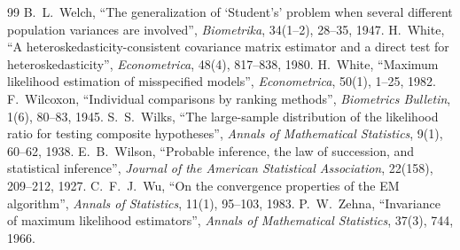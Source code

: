 \documentclass[main.tex]{subfiles}
\begin{document}
\begin{thebibliography}{99}
 B.~L.~Welch, ``The generalization of `Student's' problem when several different population variances are involved'', \emph{Biometrika}, 34(1--2), 28--35, 1947.
 H.~White, ``A heteroskedasticity-consistent covariance matrix estimator and a direct test for heteroskedasticity'', \emph{Econometrica}, 48(4), 817--838, 1980.
 H.~White, ``Maximum likelihood estimation of misspecified models'', \emph{Econometrica}, 50(1), 1--25, 1982.
 F.~Wilcoxon, ``Individual comparisons by ranking methods'', \emph{Biometrics Bulletin}, 1(6), 80--83, 1945.
 S.~S.~Wilks, ``The large-sample distribution of the likelihood ratio for testing composite hypotheses'', \emph{Annals of Mathematical Statistics}, 9(1), 60--62, 1938.
 E.~B.~Wilson, ``Probable inference, the law of succession, and statistical inference'', \emph{Journal of the American Statistical Association}, 22(158), 209--212, 1927.
 C.~F.~J.~Wu, ``On the convergence properties of the EM algorithm'', \emph{Annals of Statistics}, 11(1), 95--103, 1983.
 P.~W.~Zehna, ``Invariance of maximum likelihood estimators'', \emph{Annals of Mathematical Statistics}, 37(3), 744, 1966.

\end{thebibliography}
\end{document}
